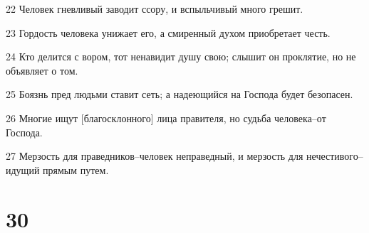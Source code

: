\par 22 Человек гневливый заводит ссору, и вспыльчивый много грешит.
\par 23 Гордость человека унижает его, а смиренный духом приобретает честь.
\par 24 Кто делится с вором, тот ненавидит душу свою; слышит он проклятие, но не объявляет о том.
\par 25 Боязнь пред людьми ставит сеть; а надеющийся на Господа будет безопасен.
\par 26 Многие ищут [благосклонного] лица правителя, но судьба человека--от Господа.
\par 27 Мерзость для праведников--человек неправедный, и мерзость для нечестивого--идущий прямым путем.

\chapter{30}

